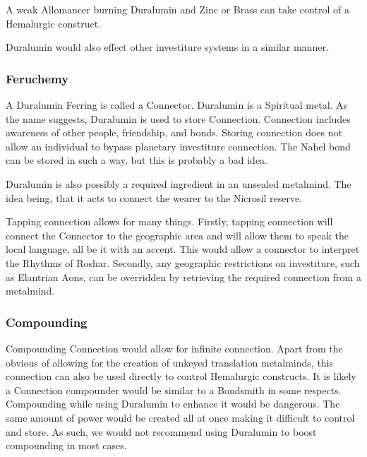 \documentclass[conference]{IEEEtran}
\begin{document}
A weak Allomancer burning Duralumin and Zinc or Brass can take control of a Hemalurgic construct.\cite{WoA-CH40}\cite{WoA-CH54}

Duralumin would also effect other investiture systems in a similar manner.\cite{dl-universal}\\
\subsubsection*{\textbf{Feruchemy}}
A Duralumin Ferring is called a Connector.\cite{ARS}  Duralumin is a Spiritual metal.\cite{FE-TB}  As the name suggests, Duralumin is used to store Connection.  Connection includes awareness of other people, friendship, and bonds.\cite{ARS}  Storing connection does not allow an individual to bypass planetary investiture connection.\cite{con-travel}
The Nahel bond can be stored in such a way, but this is probably a bad idea.\cite{con-nahel}

Duralumin is also possibly a required ingredient in an unsealed metalmind.  The idea being, that it acts to connect the wearer to the Nicrosil reserve.

Tapping connection allows for many things.  Firstly, tapping connection will connect the Connector to the geographic area and will allow them to speak the local language,\cite{BoM-CH22} all be it with an accent.  This would allow a connector to interpret the Rhythms of Roshar.\cite{con-rhy}  Secondly, any geographic restrictions on investiture, such as Elantrian Aons, can be overridden by retrieving the required connection from a metalmind.\cite{con-lock}  \\
\subsubsection*{\textbf{Compounding}}
Compounding Connection would allow for infinite connection.  Apart from the obvious of allowing for the creation of unkeyed translation metalminds,\cite{BoM-CH22} this connection can also be used directly to control Hemalurgic constructs.\cite{con-con}
It is likely a Connection compounder would be similar to a Bondsmith in some respects.\cite{RoW-CH111}\\

Compounding while using Duralumin to enhance it would be dangerous.  The same amount of power would be created all at once making it difficult to control and store.  As such, we would not recommend using Duralumin to boost compounding in most cases.\cite{dl-comp}\\
\end{document}
